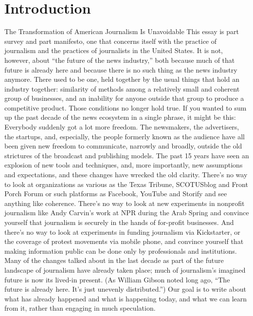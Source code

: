 \chapter{Introduction}
The Transformation of American Journalism Is Unavoidable
This essay is part survey and part manifesto, one that concerns itself with the practice
of journalism and the practices of journalists in the United States. It is not,
however, about ``the future of the news industry,'' both because much of that future
is already here and because there is no such thing as the news industry anymore.
There used to be one, held together by the usual things that hold an industry
together: similarity of methods among a relatively small and coherent group of
businesses, and an inability for anyone outside that group to produce a competitive
product. Those conditions no longer hold true.
If you wanted to sum up the past decade of the news ecosystem in a single phrase,
it might be this: Everybody suddenly got a lot more freedom. The newsmakers,
the advertisers, the startups, and, especially, the people formerly known as the
audience have all been given new freedom to communicate, narrowly and broadly,
outside the old strictures of the broadcast and publishing models. The past 15 years
have seen an explosion of new tools and techniques, and, more importantly, new
assumptions and expectations, and these changes have wrecked the old clarity.
There’s no way to look at organizations as various as the Texas Tribune,
SCOTUSblog and Front Porch Forum or such platforms as Facebook, YouTube
and Storify and see anything like coherence. There’s no way to look at new
experiments in nonprofit journalism like Andy Carvin’s work at NPR during
the Arab Spring and convince yourself that journalism is securely in the hands
of for-profit businesses. And there’s no way to look at experiments in funding
journalism via Kickstarter, or the coverage of protest movements via mobile
phone, and convince yourself that making information public can be done only
by professionals and institutions.
Many of the changes talked about in the last decade as part of the future landscape
of journalism have already taken place; much of journalism’s imagined
future is now its lived-in present. (As William Gibson noted long ago, ``The
future is already here. It’s just unevenly distributed.'') Our goal is to write about
what has already happened and what is happening today, and what we can learn
from it, rather than engaging in much speculation.

